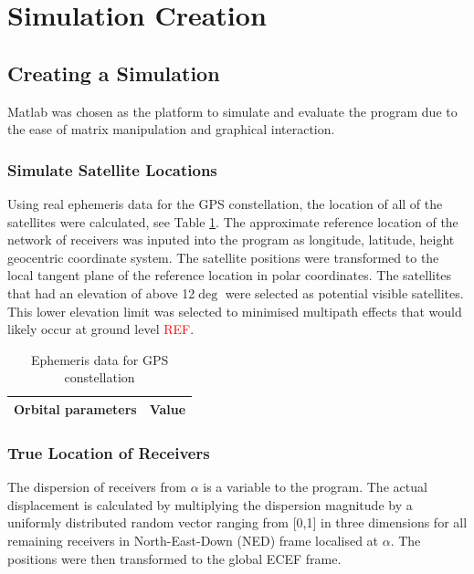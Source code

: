
\section{Simulation Creation}\label{sec:Method}

\subsection{Creating a Simulation}
Matlab was chosen as the platform to simulate and evaluate the program due to the ease of matrix manipulation and graphical interaction.
\subsubsection{Simulate Satellite Locations}
Using real ephemeris data for the GPS constellation, the location of all of the satellites were calculated, see Table \ref{Table: eph gps data}. The approximate reference location of the network of receivers was inputed into the program as longitude, latitude, height geocentric coordinate system. The satellite positions were transformed to the local tangent plane of the reference location in polar coordinates. The satellites that had an elevation of above 12$\deg$ were selected as potential visible satellites. This lower elevation limit was selected to minimised multipath effects that would likely occur at ground level \textcolor{red}{REF}. 
\begin{table}
\centering
\caption{Ephemeris data for GPS constellation}
\label{Table: eph gps data}
\begin{tabular}{|c|c|}
\hline
Orbital parameters & Value \\\hline
\end{tabular}
\end{table}





\subsubsection{True Location of Receivers}
The dispersion of receivers from $\alpha$ is a variable to the program. The actual displacement is calculated by multiplying the dispersion magnitude by a uniformly distributed random vector ranging from [0,1] in three dimensions for all remaining receivers in North-East-Down (NED) frame localised at $\alpha$. The positions were then transformed to the global ECEF frame.

